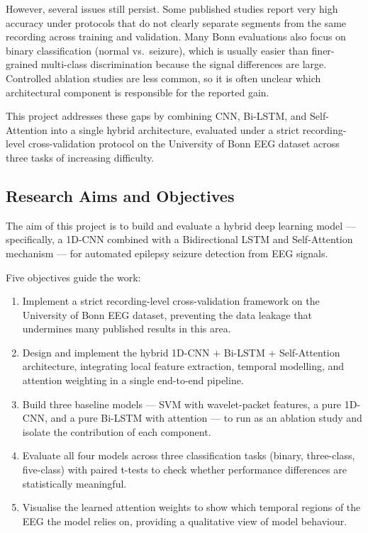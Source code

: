 However, several issues still persist. Some published studies report very high accuracy under protocols that do not clearly separate segments from the same recording across training and validation. Many Bonn evaluations also focus on binary classification (normal vs.\ seizure), which is usually easier than finer-grained multi-class discrimination because the signal differences are large. Controlled ablation studies are less common, so it is often unclear which architectural component is responsible for the reported gain.

This project addresses these gaps by combining CNN, Bi-LSTM, and Self-Attention into a single hybrid architecture, evaluated under a strict recording-level cross-validation protocol on the University of Bonn EEG dataset across three tasks of increasing difficulty.

\subsection{Research Aims and Objectives}

The aim of this project is to build and evaluate a hybrid deep learning model --- specifically, a 1D-CNN combined with a Bidirectional LSTM and Self-Attention mechanism --- for automated epilepsy seizure detection from EEG signals.

Five objectives guide the work:

\begin{enumerate}
    \item Implement a strict recording-level cross-validation framework on the University of Bonn EEG dataset, preventing the data leakage that undermines many published results in this area.

    \item Design and implement the hybrid 1D-CNN + Bi-LSTM + Self-Attention architecture, integrating local feature extraction, temporal modelling, and attention weighting in a single end-to-end pipeline.

    \item Build three baseline models --- SVM with wavelet-packet features, a pure 1D-CNN, and a pure Bi-LSTM with attention --- to run as an ablation study and isolate the contribution of each component.

    \item Evaluate all four models across three classification tasks (binary, three-class, five-class) with paired t-tests to check whether performance differences are statistically meaningful.

    \item Visualise the learned attention weights to show which temporal regions of the EEG the model relies on, providing a qualitative view of model behaviour.
\end{enumerate}

